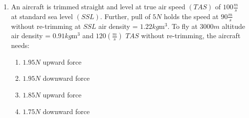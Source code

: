 \documentclass[journal]{IEEEtran}
\newcommand{\brak}[1]{\left( #1 \right)}
\begin{document}
\begin{enumerate}
    \item An aircraft is trimmed straight and level at true air speed $\brak{TAS}$ of $100 \frac{m}{s}$ at standard sea level $\brak{SSL}$. Further, pull of $5 N$ holds the speed at $90 \frac{m}{s}$ without re-trimming at $SSL$ air density = $1.22 kg \text{m}^3$. To fly at $3000 m$ altitude air density = $0.91 kg \text{m}^3$ and $120 \brak{\frac{m}{s}}$ $TAS$ without re-trimming, the aircraft needs:
    \begin{enumerate}
        \item $1.95 N$ upward force
        \item $1.95 N$ downward force
        \item $1.85 N$ upward force
        \item $1.75 N$ downward force
    \end{enumerate}
    
   



\end{enumerate}
\end{document}
